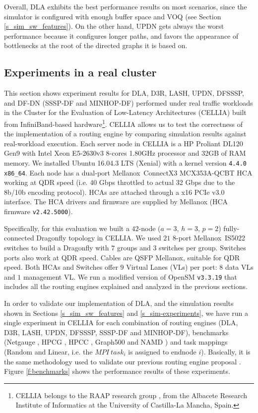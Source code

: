 \documentclass[review]{elsarticle}
\newcommand{\dfly}{Dragonfly}
\newcommand{\ibl}{InfiniBand}
\begin{document}
Overall, DLA exhibits the best performance results on most scenarios, since the simulator is configured with enough buffer space and VOQ (see Section \ref{s_sim_sw_features}).
On the other hand, UPDN gets always the worst performance because it configures longer paths,
and favors the appearance of bottlenecks at the root of the directed graphs it is based on.

\subsection{Experiments in a real cluster}

This section shows experiment results for DLA, D3R, LASH, UPDN, DFSSSP, and DF-DN (SSSP-DF and MINHOP-DF) performed under real traffic
workloads in the Cluster for the Evaluation of Low-Latency Architectures (CELLIA) built from \ibl-based
hardware\footnote{CELLIA belongs to the RAAP research group \cite{web-raap-group}, from the Albacete Research Institute of Informatics at the
University of Castilla-La Mancha, Spain.}.
CELLIA allows us to test the correctness of the implementation of a routing engine by comparing simulation results against real-workload execution.
Each server node in CELLIA is a HP Proliant DL120 Gen9 with Intel Xeon E5-2630v3 8-cores 1.80GHz processor and 32GB of RAM memory.
We installed Ubuntu 16.04.3 LTS (Xenial) with a kernel version \texttt{4.4.0 x86\_64}.
Each node has a dual-port Mellanox\texttrademark~ConnectX3 MCX353A-QCBT HCA working at QDR speed (i.e. 40 Gbps throttled to actual 32 Gbps due to the 8b/10b encoding protocol).
HCAs are attached through a x16 PCIe v3.0 interface.
The HCA drivers and firmware are supplied by Mellanox (HCA firmware \texttt{v2.42.5000}).

Specifically, for this evaluation we built a $42$-node ($a=3$, $h=3$, $p=2$) fully-connected \dfly{} topology in CELLIA.
We used $21$ $8$-port Mellanox\texttrademark~IS5022 switches to build a \dfly{} with $7$ groups and $3$ switches per group.
Switches ports also work at QDR speed.
Cables are QSFP Mellanox\texttrademark, suitable for QDR speed.
Both HCAs and Switches offer $9$ Virtual Lanes (VLs) per port: $8$ data VLs  and $1$  management VL.
We run a modified version of OpenSM \texttt{v3.3.19} \cite{opensm} that includes all the routing engines explained and analyzed in the previous sections.

In order to validate our implementation of DLA, and the simulation results shown in Sections \ref{s_sim_sw_features} and \ref{s_sim-experiments}, we have run a single experiment in CELLIA
for each combination of routing engines (DLA, D3R, LASH, UPDN, DFSSSP, SSSP-DF and MINHOP-DF),  benchmarks
(Netgauge \cite{hoefler-netgauge-hpcc07}, HPCG \cite{hpcg}, HPCC \cite{hpcc}, Graph500 \cite{graph500} and NAMD \cite{namd})
and task mappings (Random and Linear, i.e. the $MPI~task_i$ is assigned to endnode $i$).
Basically, it is the same methodology used to validate our previous routing engine proposal \cite{maglione2018_d3r}.
Figure \ref{f:benchmarks} shows the performance results of these experiments.
\end{document}
